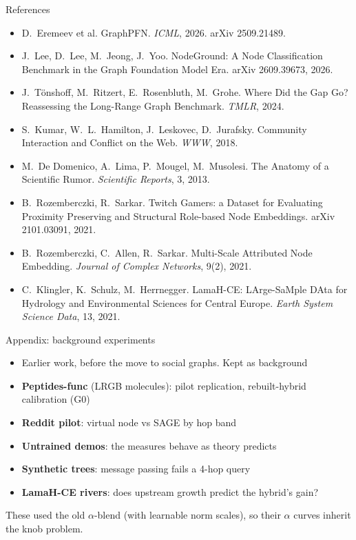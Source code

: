\documentclass[aspectratio=169,10pt]{beamer}
\newcommand{\snote}[1]{{\scriptsize\textcolor{ink!70}{#1}}}
\begin{document}
\begin{frame}[allowframebreaks]{References}
\begin{itemize}
    \item D.~Eremeev et al. GraphPFN. \emph{ICML}, 2026. arXiv 2509.21489.
    \item J.~Lee, D.~Lee, M.~Jeong, J.~Yoo. NodeGround: A Node Classification Benchmark in the Graph Foundation Model Era. arXiv 2609.39673, 2026.
    \item J.~Tönshoff, M.~Ritzert, E.~Rosenbluth, M.~Grohe. Where Did the Gap Go? Reassessing the Long-Range Graph Benchmark. \emph{TMLR}, 2024.
    \item S.~Kumar, W.~L.~Hamilton, J.~Leskovec, D.~Jurafsky. Community Interaction and Conflict on the Web. \emph{WWW}, 2018.
    \item M.~De Domenico, A.~Lima, P.~Mougel, M.~Musolesi. The Anatomy of a Scientific Rumor. \emph{Scientific Reports}, 3, 2013.
    \item B.~Rozemberczki, R.~Sarkar. Twitch Gamers: a Dataset for Evaluating Proximity Preserving and Structural Role-based Node Embeddings. arXiv 2101.03091, 2021.
    \item B.~Rozemberczki, C.~Allen, R.~Sarkar. Multi-Scale Attributed Node Embedding. \emph{Journal of Complex Networks}, 9(2), 2021.
    \item C.~Klingler, K.~Schulz, M.~Herrnegger. LamaH-CE: LArge-SaMple DAta for Hydrology and Environmental Sciences for Central Europe. \emph{Earth System Science Data}, 13, 2021.
  \end{itemize}
\end{frame}

\appendix

\begin{frame}{Appendix: background experiments}
  \begin{itemize}
    \item Earlier work, before the move to social graphs. Kept as background
    \item \textbf{Peptides-func} (LRGB molecules): pilot replication, rebuilt-hybrid calibration (G0)
    \item \textbf{Reddit pilot}: virtual node vs SAGE by hop band
    \item \textbf{Untrained demos}: the measures behave as theory predicts
    \item \textbf{Synthetic trees}: message passing fails a 4-hop query
    \item \textbf{LamaH-CE rivers}: does upstream growth predict the hybrid's gain?
  \end{itemize}
  \snote{These used the old $\alpha$-blend (with learnable norm scales), so their $\alpha$ curves inherit the knob problem.}
\end{frame}
\end{document}
